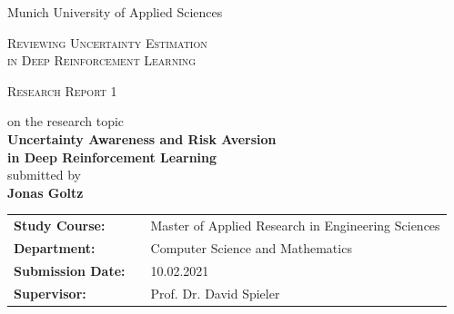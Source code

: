 \documentclass[11pt,a4paper]{article}
\begin{document}
	\begin{center}
	Munich University of Applied Sciences \\
	\end{center}
	\vspace{1.5cm}
	\noindent\hrulefill
	\begin{center}
		\LARGE{\textsc{
			Reviewing Uncertainty Estimation \\in Deep Reinforcement Learning\\
		}}
	\end{center}
	\vspace{0.1cm}
	\begin{center}
		\textsc{
			\Large{Research Report 1}
		}
	\end{center}
	\noindent\hrulefill
	\vspace{1cm}


	\begin{center}
		\small {on the research topic}\\
		\large{\textbf{
			Uncertainty Awareness and Risk Aversion\\in Deep Reinforcement Learning\\
		}}
	\vspace{2cm}
	\small{submitted by} \\
	\large{\textbf{Jonas Goltz}}
	\end{center}
	\vspace{7.5cm}


	\begin{center}
		\begin{tabular}{lll}
			\textbf{Study Course:} & &Master of Applied Research in Engineering Sciences\\
			\textbf{Department:} & &Computer Science and Mathematics\\
			\textbf{Submission Date:} & &10.02.2021\\
			\textbf{Supervisor:} & &Prof. Dr. David Spieler
		\end{tabular}
	\end{center}

	\newpage

	\tableofcontents

	\newpage

    \thispagestyle{fancy}
\end{document}
